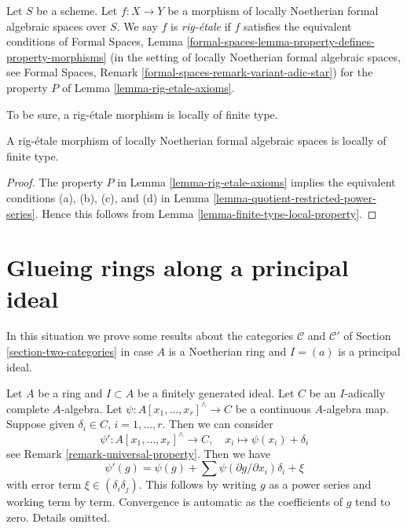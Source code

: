 \begin{definition}
\label{definition-rig-etale}
Let $S$ be a scheme. Let $f : X \to Y$ be a morphism of locally
Noetherian formal algebraic spaces over $S$. We say $f$ is
{\it rig-\'etale} if $f$ satisfies the equivalent conditions of
Formal Spaces, Lemma
\ref{formal-spaces-lemma-property-defines-property-morphisms}
(in the setting of locally Noetherian formal algebraic spaces, see
Formal Spaces, Remark \ref{formal-spaces-remark-variant-adic-star})
for the property $P$ of Lemma \ref{lemma-rig-etale-axioms}.
\end{definition}

\noindent
To be sure, a rig-\'etale morphism is locally of finite type.

\begin{lemma}
\label{lemma-rig-etale-finite-type}
A rig-\'etale morphism of locally Noetherian formal algebraic spaces
is locally of finite type.
\end{lemma}

\begin{proof}
The property $P$ in Lemma \ref{lemma-rig-etale-axioms}
implies the equivalent conditions (a), (b), (c), and (d) in
Lemma \ref{lemma-quotient-restricted-power-series}.
Hence this follows from Lemma \ref{lemma-finite-type-local-property}.
\end{proof}








\section{Glueing rings along a principal ideal}
\label{section-approximation-principal}

\noindent
In this situation we prove some results about the categories
$\mathcal{C}$ and $\mathcal{C}'$ of
Section \ref{section-two-categories}
in case $A$ is a Noetherian ring and $I = (a)$ is a principal
ideal.

\begin{remark}
\label{remark-linear-approximation}
Let $A$ be a ring and $I \subset A$ be a finitely generated ideal.
Let $C$ be an $I$-adically complete $A$-algebra.
Let $\psi : A[x_1, \ldots, x_r]^\wedge \to C$ be a continuous
$A$-algebra map. Suppose given $\delta_i \in C$, $i = 1, \ldots, r$.
Then we can consider
$$
\psi' : A[x_1, \ldots, x_r]^\wedge \to C,\quad
x_i \longmapsto \psi(x_i) + \delta_i
$$
see Remark \ref{remark-universal-property}. Then we have
$$
\psi'(g) = \psi(g) + \sum \psi(\partial g/\partial x_i)\delta_i + \xi
$$
with error term $\xi \in (\delta_i\delta_j)$. This follows by
writing $g$ as a power series and working term by term. Convergence
is automatic as the coefficients of $g$ tend to zero.
Details omitted.
\end{remark}

